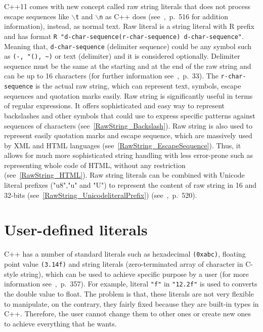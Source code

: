 \documentclass[11pt]{report}
\begin{document}
C++11 comes with new concept called raw string literals that does not process escape sequences like \texttt{$\backslash$t} and \texttt{$\backslash$n} as C++ does (see~\cite{Stroustrup:2012:Cpp11},~p.~516 for addition information), instead, as normal text. Raw literal is a string literal with R prefix and has format \texttt{R "d-char-sequence(r-char-sequence) d-char-sequence"}. Meaning that, \texttt{d-char-sequence} (delimiter sequence) could be any symbol such as \texttt{(-, "(), \~{})} or text (delimiter) and it is considered optionally. Delimiter sequence must be the same at the starting and at the end of the raw string and can be up to 16 characters (for further information see~\cite{ISO:2011:Cpplanguage},~p.~33). The \texttt{r-char-sequence} is the actual raw string, which can represent text, symbols, escape sequences and quotation marks easily. Raw string is significantly useful in terms of regular expressions. It offers sophisticated and easy way to represent backslashes and other symbols that could use to express specific patterns against sequences of characters (see~\ref{RawString_Backslash}). Raw string is also used to represent easily quotation marks and escape sequence, which are massively used by XML and HTML languages (see~\ref{RawString_EscapeSequence}). Thus, it allows for much more sophisticated string handling with less error-prone such as representing whole code of HTML, without any restriction (see~\ref{RawString_HTML}). Raw string literals can be combined with Unicode literal prefixes ("u8","u" and "U") to represent the content of raw string in 16 and 32-bits (see~\ref{RawString_UnicodeliteralPrefix}) (see~\cite{Gregorie:professionalcpp},~p.~520).

\section{User-defined literals}
\label{section: User-defined literals}
C++ has a number of standard literals such as hexadecimal \texttt{(0xabc)}, floating point value \texttt{(3.14f)} and string literals (zero-terminated array of character in C-style string), which can be used to achieve specific purpose by a user (for more information see~\cite{Overland:2011:CWF},~p.~357). For example, literal \texttt{"f"} in \texttt{"12.2f"} is used to converts the double value to float. The problem is that, these literals are not very flexible to manipulate, on the contrary, they fairly fixed because they are built-in types in C++. Therefore, the user cannot change them to other ones or create new ones to achieve everything that he wants.
\end{document}
